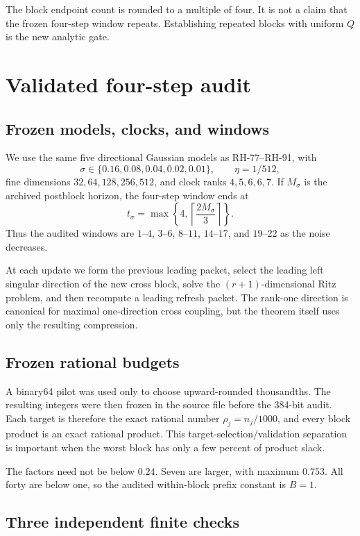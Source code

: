 \documentclass[11pt]{article}
\theoremstyle{definition}
\theoremstyle{remark}
\begin{document}
The block endpoint count is rounded to a multiple of four.  It is not a claim
that the frozen four-step window repeats.  Establishing repeated blocks with
uniform $Q$ is the new analytic gate.

\section{Validated four-step audit}

\subsection{Frozen models, clocks, and windows}

We use the same five directional Gaussian models as RH-77--RH-91, with
\[
 \sigma\in\{0.16,0.08,0.04,0.02,0.01\},\qquad
 \eta=1/512,
\]
fine dimensions $32,64,128,256,512$, and clock ranks $4,5,6,6,7$.  If
$M_\sigma$ is the archived postblock horizon, the four-step window ends at
\[
 t_\sigma=\max\left\{4,\left\lceil\frac{2M_\sigma}{3}\right\rceil\right\}.
\]
Thus the audited windows are $1$--$4$, $3$--$6$, $8$--$11$, $14$--$17$,
and $19$--$22$ as the noise decreases.

At each update we form the previous leading packet, select the leading left
singular direction of the new cross block, solve the $(r+1)$-dimensional Ritz
problem, and then recompute a leading refresh packet.  The rank-one direction
is canonical for maximal one-direction cross coupling, but the theorem itself
uses only the resulting compression.

\subsection{Frozen rational budgets}

A binary64 pilot was used only to choose upward-rounded thousandths.  The
resulting integers were then frozen in the source file before the 384-bit
audit.  Each target is therefore the exact rational number
$\rho_j=n_j/1000$, and every block product is an exact rational product.
This target-selection/validation separation is important when the worst block
has only a few percent of product slack.

The factors need not be below $0.24$.  Seven are larger, with maximum
$0.753$.  All forty are below one, so the audited within-block prefix constant
is $B=1$.

\subsection{Three independent finite checks}
\end{document}
